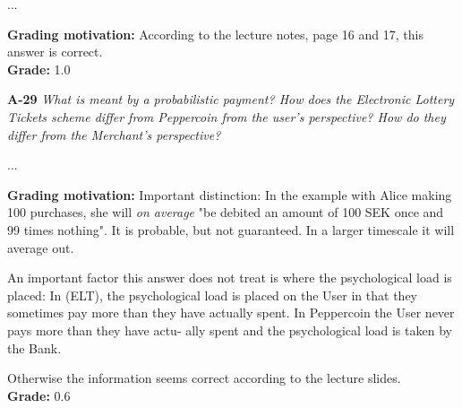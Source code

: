 \documentclass[a4paper]{article}
\newcommand{\Q}[2]{
  \vspace{10pt} \textbf{#1} \textit{#2}
 }
\newcommand{\A}[1]{ #1 }
\newcommand{\Grade}[2]{ 
  \textbf{Grading motivation:} #2 \\ 
  \hspace*{\fill} \textbf{Grade:} #1 
}
\begin{document}
\A{
  ...
}

\Grade{1.0}{
  According to the lecture notes, page 16 and 17, this answer is correct.
}

\Q{A-29} {What  is  meant  by  a  probabilistic  payment?   How  does  the  
Electronic  Lottery  Tickets  scheme  differ from Peppercoin from the user's perspective?
How do they differ from the Merchant's perspective?}

\A{
  ...
}

\Grade{0.6}{
  Important distinction: In the example with Alice making 100 purchases, she will \textit{on average} "be debited an amount of 100 SEK once and 99 times
  nothing". It is probable, but not guaranteed. In a larger timescale it will average out.

  An important factor this answer does not treat is where the psychological load is placed: 
  In (ELT), the psychological load is placed on the User in that they sometimes pay more than they have actually 
  spent. In Peppercoin the User never pays more than they have actu-
  ally spent and the psychological load is taken by the Bank.

  Otherwise the information seems correct according to the lecture slides.
}
\end{document}
